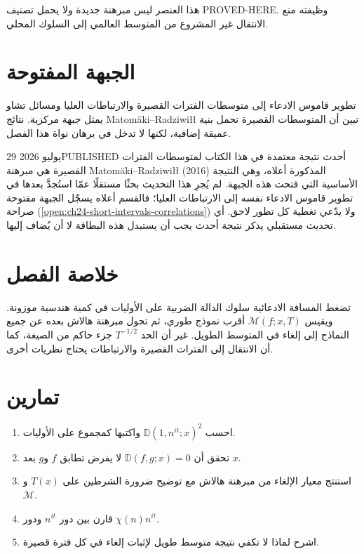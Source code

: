 هذا العنصر ليس مبرهنة جديدة ولا يحمل تصنيف \textenglish{PROVED-HERE}. وظيفته منع الانتقال غير المشروع من المتوسط العالمي إلى السلوك المحلي.

\section{الجبهة المفتوحة}

\begin{openproblem}
\label{open:ch24-short-intervals-correlations}
\openresult
تطوير قاموس الادعاء إلى متوسطات الفترات القصيرة والارتباطات العليا ومسائل تشاو يمثل جبهة مركزية. نتائج Matomäki--Radziwiłł \cite{matomakiRadziwill2016short} تبين أن المتوسطات القصيرة تحمل بنية عميقة إضافية، لكنها لا تدخل في برهان نواة هذا الفصل.
\end{openproblem}

\begin{frontiercard}{29 يوليو 2026}{PUBLISHED}{\cite{matomakiRadziwill2016short}}
أحدث نتيجة معتمدة في هذا الكتاب لمتوسطات الفترات القصيرة هي مبرهنة Matomäki--Radziwiłł (2016) المذكورة أعلاه، وهي النتيجة الأساسية التي فتحت هذه الجبهة. لم يُجرِ هذا التحديث بحثًا مستقلًا عمّا استُجدَّ بعدها في تطوير قاموس الادعاء نفسه إلى الارتباطات العليا؛ فالقسم أعلاه يسجّل الجبهة مفتوحة صراحة (\ref{open:ch24-short-intervals-correlations}) ولا يدّعي تغطية كل تطور لاحق. أي تحديث مستقبلي يذكر نتيجة أحدث يجب أن يستبدل هذه البطاقة لا أن يُضاف إليها.
\end{frontiercard}

\section*{خلاصة الفصل}

تضغط المسافة الادعائية سلوك الدالة الضربية على الأوليات في كمية هندسية موزونة. ويقيس \(\mathcal M(f;x,T)\) أقرب نموذج طوري، ثم تحول مبرهنة هالاش بعده عن جميع النماذج إلى إلغاء في المتوسط الطويل. غير أن الحد \(T^{-1/2}\) جزء حاكم من الصيغة، كما أن الانتقال إلى الفترات القصيرة والارتباطات يحتاج نظريات أخرى.

\section*{تمارين}
\begin{enumerate}
  \item احسب \(\mathbb D(1,n^{it};x)^2\) واكتبها كمجموع على الأوليات.
  \item تحقق أن \(\mathbb D(f,g;x)=0\) لا يفرض تطابق \(f\) و\(g\) بعد \(x\).
  \item استنتج معيار الإلغاء من مبرهنة هالاش مع توضيح ضرورة الشرطين على \(T(x)\) و\(\mathcal M\).
  \item قارن بين دور \(n^{it}\) ودور \(\chi(n)n^{it}\).
  \item اشرح لماذا لا تكفي نتيجة متوسط طويل لإثبات إلغاء في كل فترة قصيرة.
\end{enumerate}
